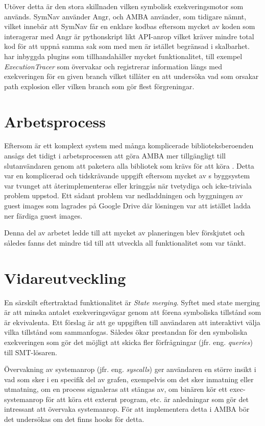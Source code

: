 Utöver detta är den stora skillnaden vilken symbolisk exekveringsmotor som
används. SymNav använder Angr, och AMBA använder, som tidigare nämnt, \stoe{}
vilket innebär att SymNav får en enklare kodbas eftersom mycket av koden som
interagerar med Angr är pythonskript likt API-anrop vilket kräver mindre total
kod för att uppnå samma sak som med \stoe{} men är istället begränsad i
skalbarhet. \stoe{} har inbyggda plugins som tillhandahåller mycket
funktionalitet, till exempel \emph{ExecutionTracer} som övervakar och
registrerar information längs med exekveringen för en given branch vilket
tillåter en att undersöka vad som orsakar path explosion eller vilken branch som
gör flest förgreningar.

\section{Arbetsprocess}
Eftersom \stoe{} är ett komplext system med många komplicerade
biblioteksberoenden ansågs det tidigt i arbetsprocessen att göra AMBA mer
tillgängligt till slutanvändaren genom att paketera alla bibliotek som krävs för
att köra \stoe{}. Detta var en komplicerad och tidskrävande uppgift eftersom
mycket av \stoe{}s byggsystem var tvunget att återimplementeras eller kringgås
när tvetydiga och icke-triviala problem uppstod. Ett sådant problem var
nedladdningen och byggningen av guest images som \stoe{} lagrades på Google
Drive där lösningen var att istället ladda ner färdiga guest images.

Denna del av arbetet ledde till att mycket av planeringen blev förskjutet och
således fanns det mindre tid till att utveckla all funktionalitet som var tänkt.

\section{Vidareutveckling} En särskilt eftertraktad funktionalitet är
\textit{State merging}. Syftet med state merging är att minska antalet
exekveringsvägar genom att förena symboliska tillstånd som är ekvivalenta. Ett
förslag är att ge uppgiften till användaren att interaktivt välja vilka
tillstånd som sammanfogas. Således ökar prestandan för den symboliska
exekveringen som gör det möjligt att skicka fler förfrågningar (jfr. eng.
\emph{queries}) till SMT-lösaren.

Övervakning av systemanrop (jfr. eng. \emph{syscalls}) ger användaren en större
insikt i vad som sker i en specifik del av grafen, exempelvis om det sker
inmatning eller utmatning, om en process signaleras att stängas av, om binären
kör ett exec-systemanrop för att köra ett externt program, etc. är anledningar
som gör det intressant att övervaka systemanrop. För att implementera detta i
AMBA bör det undersökas om det finns hooks för detta.

